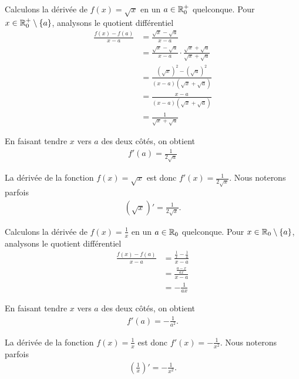 \documentclass[main.tex]{subfiles}
\begin{document}
\begin{example}

    Calculons la dérivée de $f(x) = \sqrt x$ en un $a \in \mathbb{R}_0^+$ quelconque.
    Pour $x \in \mathbb{R}_0^+ \setminus \{a\}$,
    analysons le quotient différentiel
    \begin{align}
        \frac {f(x) - f(a)}{x - a}
        &= \frac {\sqrt x - \sqrt a}{x - a}\\
        &= \frac {\sqrt x - \sqrt a}{x - a} \cdot \frac{\sqrt x + \sqrt a}{\sqrt x + \sqrt a}\\
        &= \frac {{(\sqrt x)}^2 - {(\sqrt a)}^2}{(x - a) (\sqrt x + \sqrt a)}\\
        &= \frac {x - a} {(x - a) (\sqrt x + \sqrt a)}\\
        &= \frac 1 {\sqrt x + \sqrt a}
    \end{align}

    En faisant tendre $x$ vers $a$ des deux côtés,
    on obtient
    \begin{align}
        f'(a) = \frac 1 {2 \sqrt a}
    \end{align}
    
    La dérivée de la fonction $f(x) = \sqrt x$ est donc $f'(x) = \frac 1 {2 \sqrt x}$.
    Nous noterons parfois
    \begin{align}
        (\sqrt x)'=\frac 1 {2 \sqrt x}.
    \end{align}
\end{example}

\begin{example}

    Calculons la dérivée de $f(x) = \frac 1 x$ en un $a \in \mathbb{R}_0$ quelconque.
    Pour $x \in \mathbb{R}_0 \setminus \{a\}$,
    analysons le quotient différentiel
    \begin{align}
        \frac {f(x) - f(a)} {x - a}
        &= \frac {\frac 1 x - \frac 1 a}{x - a}\\
        &= \frac{\frac{a - x}{ax}}{x - a}\\
        &= - \frac {1}{ax}
    \end{align}

    En faisant tendre $x$ vers $a$ des deux côtés,
    on obtient
    \begin{align}
        f'(a) = - \frac {1} {a^2}.
    \end{align}
    
    La dérivée de la fonction $f(x) = \frac 1 x$ est donc $f'(x) = - \frac{1}{x^2}$.
    Nous noterons parfois
    \begin{align}
        \left(\frac 1 x\right)'=- \frac 1 {x^2}.
    \end{align}
\end{example}
\end{document}
